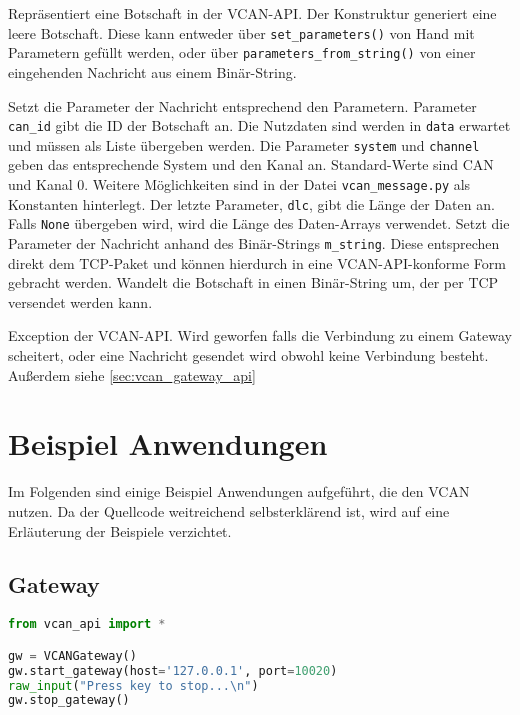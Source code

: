 \begin{description}
    Repräsentiert eine Botschaft in der VCAN-API. Der Konstruktur generiert eine leere Botschaft. Diese kann entweder über \texttt{set\_parameters()} von Hand mit Parametern gefüllt werden, oder über \texttt{parameters\_from\_string()} von einer eingehenden Nachricht aus einem Binär-String.
    \begin{description}
        Setzt die Parameter der Nachricht entsprechend den Parametern. Parameter \texttt{can\_id} gibt die ID der Botschaft an. Die Nutzdaten sind werden in \texttt{data} erwartet und müssen als Liste übergeben werden. Die Parameter \texttt{system} und \texttt{channel} geben das entsprechende System und den Kanal an. Standard-Werte sind CAN und Kanal 0. Weitere Möglichkeiten sind in der Datei \texttt{vcan\_message.py} als Konstanten hinterlegt. Der letzte Parameter, \texttt{dlc}, gibt die Länge der Daten an. Falls \texttt{None} übergeben wird, wird die Länge des Daten-Arrays verwendet.
        Setzt die Parameter der Nachricht anhand des Binär-Strings \texttt{m\_string}. Diese entsprechen direkt dem TCP-Paket und können hierdurch in eine VCAN-API-konforme Form gebracht werden.
        Wandelt die Botschaft in einen Binär-String um, der per TCP versendet werden kann.
    \end{description}
\end{description}

\begin{description}
    Exception der VCAN-API. Wird geworfen falls die Verbindung zu einem Gateway scheitert, oder eine Nachricht gesendet wird obwohl keine Verbindung besteht. Außerdem siehe \ref{sec:vcan_gateway_api}
\end{description}




\section{Beispiel Anwendungen}
\label{sec:vcan_beispiele}
Im Folgenden sind einige Beispiel Anwendungen aufgeführt, die den VCAN nutzen. Da der Quellcode weitreichend selbsterklärend ist, wird auf eine Erläuterung der Beispiele verzichtet.

\subsection{Gateway}
\label{sec:vcan_gateway_beispiele}
\begin{lstlisting}[frame=single, language=Python, basicstyle=\footnotesize, caption={Einfaches Gateway}, label={lst:bsp_gateway1}]
from vcan_api import *

gw = VCANGateway()
gw.start_gateway(host='127.0.0.1', port=10020)
raw_input("Press key to stop...\n")
gw.stop_gateway()
\end{lstlisting}

